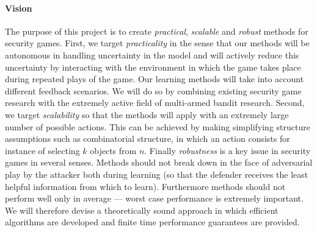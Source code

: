 
\paragraph{Vision}
The purpose of this project is to create \textit{practical}, \textit{scalable} and \textit{robust} methods for security games. First, we target \textit{practicality}  in the sense that our methods will be autonomous in handling uncertainty in the model and will actively reduce this uncertainty by interacting with the environment in which the game takes place during repeated plays of the game. Our learning methods will take into account different feedback scenarios. We will do so by combining existing security game research with the extremely active field of multi-armed bandit research. 
Second, we target \textit{scalability} so that the methods will apply with an extremely large number of possible actions. This can be achieved by making simplifying structure assumptions such as combinatorial structure, in which an action consists for instance of selecting $k$ objects from $n$. %
Finally \textit{robustness}  is a key issue in security games in several senses.  Methods should not break down in the face of adversarial play by the attacker both during learning (so that the defender receives the least helpful information from which to learn).  Furthermore methods should not perform well only in average --- worst case performance is extremely important.  We will therefore devise a theoretically sound approach in which efficient algorithms are developed and finite time performance guarantees are provided.

